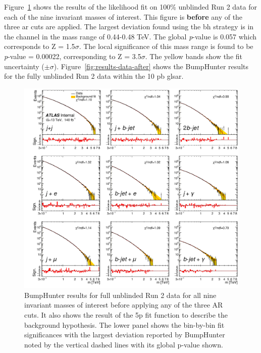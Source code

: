 Figure~\ref{fig:results-data-before} shows the results of the likelihood fit on 100\% unblinded Run 2 data for each of the nine invariant masses of interest. This figure is \textbf{before} any of 
the three \gls{ar} cuts are applied. The largest deviation found using the \gls{bh} strategy is in the \mjmu channel in the mass range of 0.44-0.48 TeV. The 
global \textit{p}-value is 0.057 which corresponds to Z = 1.5$\sigma$. The local significance of this mass range is found to be \textit{p}-value = 0.00022, corresponding to 
Z = 3.5$\sigma$. The yellow bands show the fit uncertainty ($\pm\sigma$). Figure~\ref{fig:results-data-after} shows the BumpHunter results for the fully unblinded Run 2 data within the 10 pb gls{ar}. 
\newpage

\begin{figure}[H]
    \centering
    \includegraphics[scale=0.8]{figs/ch6/results/pub_mass_BH_before_yellow.pdf}%
\caption{BumpHunter results for full unblinded Run 2 data for all nine invariant masses of interest before applying any of the three AR cuts. It also shows the result of the 
5p fit function to describe the background hypothesis. The lower panel shows the bin-by-bin fit significances with the largest deviation reported by BumpHunter noted by the 
vertical dashed lines with its global p-value shown.}
\label{fig:results-data-before}
\end{figure}

